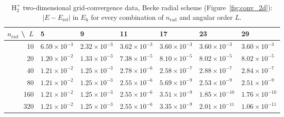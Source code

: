 \begin{table}[H]
  \centering\small
  \begin{tabular}{@{}rllllll@{}}
    \toprule
    $n_\mathrm{rad}$ \textbackslash\ $L$ & 5 & 9 & 11 & 17 & 23 & 29 \\
    \midrule
    10 & $6.59\times10^{-3}$ & $2.32\times10^{-3}$ & $3.62\times10^{-3}$ & $3.60\times10^{-3}$ & $3.60\times10^{-3}$ & $3.60\times10^{-3}$ \\
    20 & $1.20\times10^{-2}$ & $1.33\times10^{-3}$ & $7.38\times10^{-5}$ & $8.10\times10^{-5}$ & $8.02\times10^{-5}$ & $8.02\times10^{-5}$ \\
    40 & $1.21\times10^{-2}$ & $1.25\times10^{-3}$ & $2.78\times10^{-6}$ & $2.58\times10^{-7}$ & $2.88\times10^{-7}$ & $2.84\times10^{-7}$ \\
    80 & $1.21\times10^{-2}$ & $1.25\times10^{-3}$ & $2.55\times10^{-6}$ & $5.69\times10^{-9}$ & $2.53\times10^{-9}$ & $2.51\times10^{-9}$ \\
    160 & $1.21\times10^{-2}$ & $1.25\times10^{-3}$ & $2.55\times10^{-6}$ & $3.51\times10^{-9}$ & $1.85\times10^{-10}$ & $1.76\times10^{-10}$ \\
    320 & $1.21\times10^{-2}$ & $1.25\times10^{-3}$ & $2.55\times10^{-6}$ & $3.35\times10^{-9}$ & $2.01\times10^{-11}$ & $1.06\times10^{-11}$ \\
    \bottomrule
  \end{tabular}
  \caption{H$_2^+$ two-dimensional grid-convergence data, Becke radial scheme (Figure~\ref{fig:conv_2d}): $|E-E_\mathrm{ref}|$ in $E_\mathrm{h}$ for every combination of $n_\mathrm{rad}$ and angular order $L$.}
  \label{tab:data_2d_becke}
\end{table}

